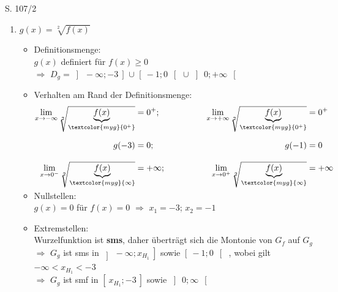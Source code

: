 \begin{Exercise}{S. 107/2}{}
\begin{enumerate}[label=\arabic*.,leftmargin=*]
    \item [2.] {
        $g(x) =  \sqrt[2]{f(x)}$ \\[-3.0ex] 
        \begin{itemize}[leftmargin=*]
            \item Definitionsmenge: \\[1.0ex]{
                $g(x)$ definiert für $f(x) \geq 0$\\[1.0ex]
                $\Rightarrow$ \quad $D_{g} = \left] \ -\infty; -3 \ \right]$ \quad $\cup$ \quad $\left[ \ -1; 0 \ \right[$ \quad $\cup$ \quad $\left] \ 0; +\infty \ \right[$\\[-2.0ex]
                }
            \item Verhalten am Rand der Definitionsmenge: \\[-2.0ex]{
                \begin{align*}
                    \lim\limits_{x \to -\infty} \sqrt[2]{\underbrace{f(x)}_{\textcolor{myg}{0^{+}}}} &= 0^{+}; \qquad \qquad &\lim\limits_{x \to +\infty} \sqrt[2]{\underbrace{f(x)}_{\textcolor{myg}{0^{+}}}} &= 0^{+} && \\[1.5ex]
                    g(-3) &= 0; &g(-1) &= 0 && \\[2.0ex]
                    \lim\limits_{x \to 0^{-}} \sqrt[2]{\underbrace{f(x)}_{\textcolor{myg}{\infty}}} &= + \infty; \qquad \qquad &\lim\limits_{x \to 0^{+}} \sqrt[2]{\underbrace{f(x)}_{\textcolor{myg}{\infty}}} &= + \infty && \\[-2.0ex]
                \end{align*}
                }
            \item Nullstellen: \\[1.0ex]{
                $g(x) = 0$ für $f(x) = 0$ \qquad $\Rightarrow$ \quad $x_{1} = -3$; \quad $x_{2} = -1$\\[-2.0ex]
                }
            \item Extremstellen: \\[1.0ex]{
                Wurzelfunktion ist \textbf{sms}, daher überträgt sich die Montonie von $G_{f}$ auf $G_{g}$\\[1.0ex]
                $\Rightarrow$ \quad $G_{g}$ ist sms in $\left] \ -\infty; x_{H_{1}} \ \right]$ sowie $\left[ \ -1; 0 \ \right[$ \quad, wobei gilt $-\infty < x_{H_{1}} < -3$ \\[1.0ex]
                $\Rightarrow$ \quad $G_{g}$ ist smf in $\left[ \ x_{H_{1}} ; -3 \ \right]$ sowie $\left] \ 0; \infty \ \right[$ \\[-2.0ex]
}
\end{itemize}}
\end{enumerate}
\end{Exercise}

